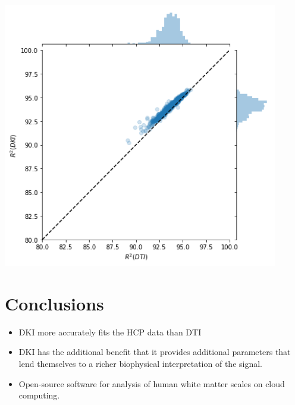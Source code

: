 \documentclass[a0, landscape]{a0poster}
\begin{document}
\begin{multicols}{3}
\begin{minipage}[b]{1\linewidth}
\begin{minipage}[b]{0.25\linewidth}
  \includegraphics[width=12cm]{dti_1000_dki.png}
  \end{minipage}
\end{minipage}


\color{SaddleBrown} %

\section*{Conclusions}
\large
\begin{itemize}

\item DKI more accurately fits the HCP data than DTI

\item DKI has the additional benefit that it provides additional parameters that
lend themselves to a richer biophysical interpretation of the signal.

\item Open-source software for analysis of human white matter scales on cloud computing.
\end{itemize}

\color{DarkSlateGray} %


\end{multicols}
\end{document}
